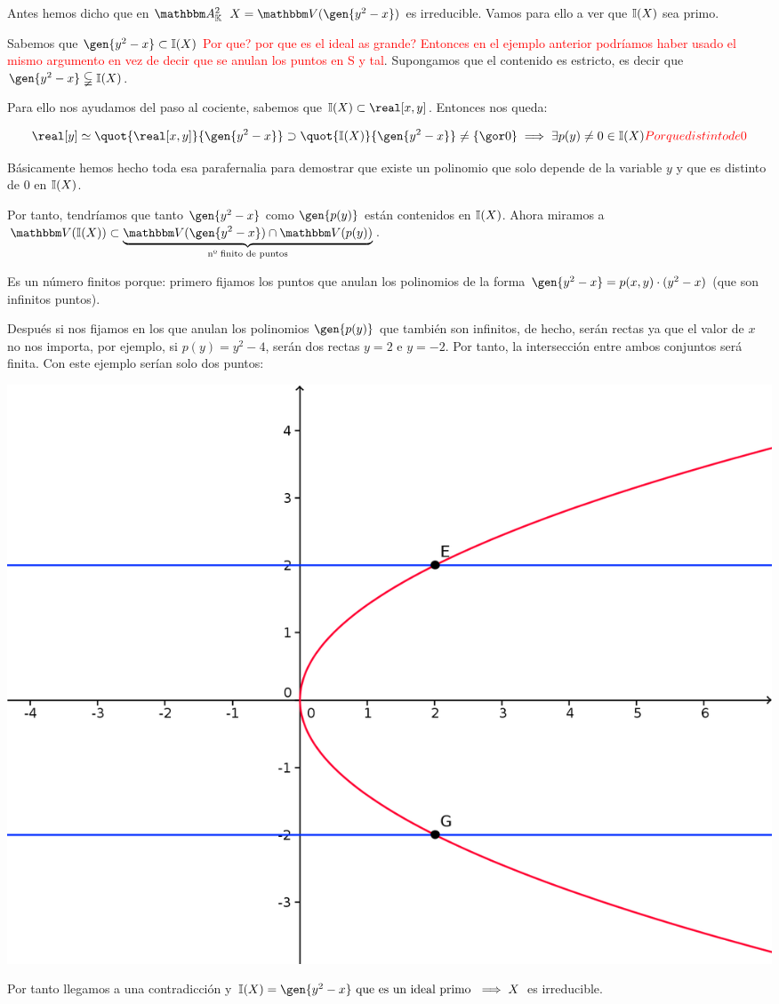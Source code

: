 \begin{example}
	Antes hemos dicho que en $\A^2_{\K}$ $X=\V(\gen{y^2-x})$ es irreducible. Vamos para ello a ver que $\mathbb{I}(X)$ sea primo.

	Sabemos que $\gen{y^2-x} \subset \I(X)$ \textcolor{red}{Por que? por que es el ideal as grande? Entonces en el ejemplo anterior podríamos haber usado el mismo argumento en vez de decir que se anulan los puntos en S y tal}. Supongamos que el contenido es estricto, es decir que $\gen{y^2-x} \subsetneqq \I(X)$.

	Para ello nos ayudamos del paso al cociente, sabemos que $\I(X) \subset \real[x,y]$. Entonces nos queda:

	$$ \real[y] \simeq \quot{\real[x,y]}{\gen{y^2-x}} \supset \quot{\I(X)}{\gen{y^2-x}}  \neq \{\cls{0}\} \implies \exists p(y) \neq 0 \in \I(X) \textcolor{red}{Por que distinto de 0}$$

	Básicamente hemos hecho toda esa parafernalia para demostrar que existe un polinomio que solo depende de la variable $y$ y que es distinto de 0 en $\mathbb{I}(X)$.

	Por tanto, tendríamos que tanto $\gen{y^2-x}$ como $\gen{p(y)}$ están contenidos en $\mathbb{I}(X)$. Ahora miramos a $\V(\I(X)) \subset \underbrace{\V(\gen{y^2-x}) \cap \V(p(y))}_{\text{nº finito de puntos}}$.

	Es un número finitos porque: primero fijamos los puntos que anulan los polinomios de la forma $\gen{y^2-x}=p(x,y)\cdot(y^2-x)$ (que son infinitos puntos).

	Después si nos fijamos en los que anulan los polinomios $\gen{p(y)}$ que también son infinitos, de hecho, serán rectas ya que el valor de $x$ no nos importa, por ejemplo, si $p(y)=y^2-4$, serán dos rectas $y=2$ e $y=-2$. Por tanto, la intersección entre ambos conjuntos será finita. Con este ejemplo serían solo dos puntos:

	\begin{center}
		\includegraphics[scale=0.45]{img/parabola.png}
	\end{center}

	Por tanto  llegamos a una contradicción y $\I(X)=\gen{y^2-x} \text{ que es un ideal primo }\implies X$ es irreducible.
\end{example}

